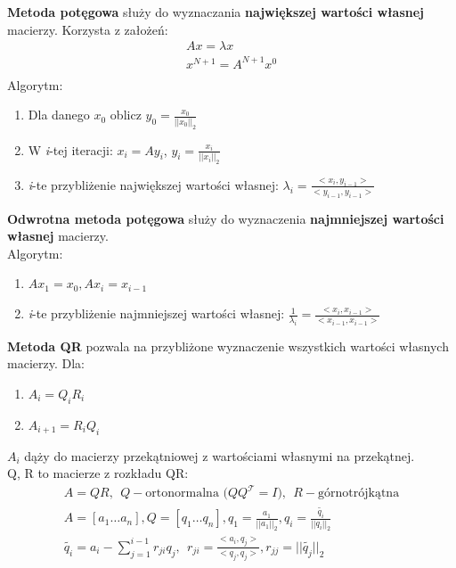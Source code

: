 \documentclass[12pt]{article}
\begin{document}
    \begin{definition}
        \textbf{Metoda potęgowa} służy do wyznaczania \textbf{największej wartości własnej} macierzy. Korzysta z założeń:
        \begin{align*}
            Ax = \lambda x\\
            x^{N+1} = A^{N+1} x^0\\
        \end{align*}
        Algorytm:
        \begin{enumerate}
            \item Dla danego $x_0$ oblicz $y_0 = \frac{x_0}{||x_0||_2}$
            \item W \textit{i}-tej iteracji: $x_i = Ay_i$, $y_i = \frac{x_i}{||x_i||_2}$
            \item \textit{i}-te przybliżenie największej wartości własnej: $\lambda_i = \frac{<x_i, y_{i-1}>}{<y_{i-1}, y_{i-1}>}$
        \end{enumerate}
    \end{definition}

    \begin{definition}
        \textbf{Odwrotna metoda potęgowa} służy do wyznaczenia \textbf{najmniejszej wartości własnej} macierzy.\\
        Algorytm:
        \begin{enumerate}
            \item $Ax_1 = x_0, Ax_i = x_{i-1}$
            \item \textit{i}-te przybliżenie najmniejszej wartości własnej: $\frac{1}{\lambda_i} = \frac{<x_i, x_{i-1}>}{<x_{i-1}, x_{i-1}>}$
        \end{enumerate}
    \end{definition}

    \begin{definition}
        \textbf{Metoda QR}  pozwala na przybliżone wyznaczenie wszystkich wartości własnych macierzy. Dla:
        \begin{enumerate}
            \item $A_i = Q_i R_i$
            \item $A_{i+1} = R_i Q_i$
        \end{enumerate}
        $A_i$ dąży do macierzy przekątniowej z wartościami własnymi na przekątnej.\\

        Q, R to macierze z rozkładu QR:
        \begin{gather*}
            A = QR, ~~ Q - \text{ortonormalna ($QQ^\mathcal{T}=I$)}, ~~ R - \text{górnotrójkątna}\\
            A = [a_1 \dots a_n], Q = [q_1 \dots q_n], q_1 = \frac{a_1}{||a_1||_2}, q_i = \frac{\tilde{q_i}}{||q_i||_2}\\
            \tilde{q_i} = a_i - \sum_{j=1}^{i-1} r_{ji} q_j, ~~ r_{ji} = \frac{<a_i, q_j>}{<q_j, q_j>}, r_{jj} = ||\tilde{q_j}||_2
        \end{gather*}
    \end{definition}
\end{document}
